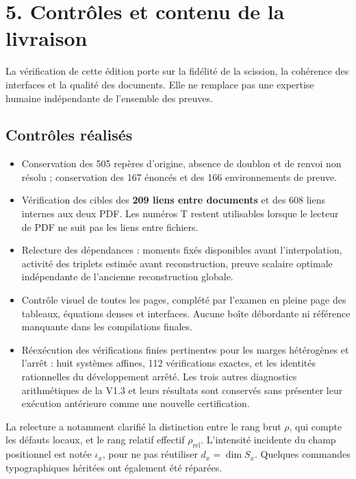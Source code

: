\documentclass[11pt,a4paper]{article}
\begin{document}
\clearpage
\section*{5. Contrôles et contenu de la livraison}
La vérification de cette édition porte sur la fidélité de la scission,
la cohérence des interfaces et la qualité des documents. Elle ne remplace
pas une expertise humaine indépendante de l'ensemble des preuves.

\subsection*{Contrôles réalisés}
\begin{itemize}
\item Conservation des 505 repères d'origine, absence de doublon et de
renvoi non résolu ; conservation des 167 énoncés et des 166 environnements
de preuve.
\item Vérification des cibles des \textbf{209 liens entre documents}
et des 608 liens internes aux deux PDF. Les numéros T restent utilisables
lorsque le lecteur de PDF ne suit pas les liens entre fichiers.
\item Relecture des dépendances : moments fixés disponibles avant
l'interpolation, activité des triplets estimée avant reconstruction,
preuve scalaire optimale indépendante de l'ancienne reconstruction globale.
\item Contrôle visuel de toutes les pages, complété par l'examen en
pleine page des tableaux, équations denses et interfaces. Aucune boîte
débordante ni référence manquante dans les compilations finales.
\item Réexécution des vérifications finies pertinentes pour les marges
hétérogènes et l'arrêt : huit systèmes affines, 112 vérifications exactes,
et les identités rationnelles du développement arrêté. Les trois autres
diagnostics arithmétiques de la V1.3 et leurs résultats sont conservés
sans présenter leur exécution antérieure comme une nouvelle certification.
\end{itemize}

La relecture a notamment clarifié la distinction entre le rang brut
\(\rho\), qui compte les défauts locaux, et le rang relatif effectif
\(\rho_{\mathrm{rel}}\). L'intensité incidente du champ positionnel
est notée \(\iota_x\), pour ne pas réutiliser \(d_x=\dim S_x\).
Quelques commandes typographiques héritées ont également été réparées.
\end{document}

